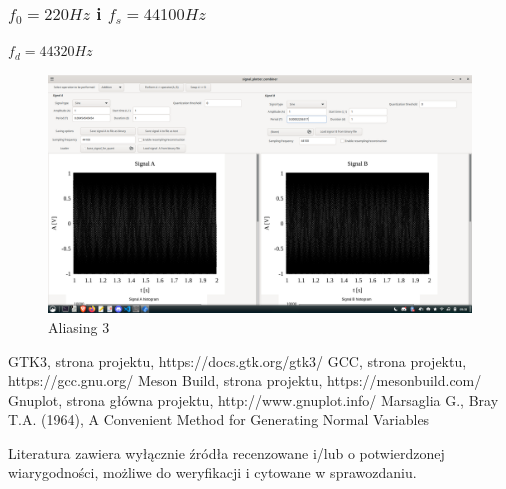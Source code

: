 \documentclass{article}
\begin{document}
\subsubsection{$f_0 = 220Hz$ i $f_s = 44100Hz$}
$f_d = 44320Hz$
\begin{figure}[H]
 \centering
 \includegraphics[width=14cm]{aliasing3.png}
 \vspace{-0.3cm}
 \caption{Aliasing 3}
 \label{fig:al3}
\end{figure}

\begin{thebibliography}{0}
 GTK3, strona projektu, https://docs.gtk.org/gtk3/
 GCC, strona projektu, https://gcc.gnu.org/  
 Meson Build, strona projektu, https://mesonbuild.com/
 Gnuplot, strona główna projektu, http://www.gnuplot.info/
 Marsaglia G., Bray T.A. (1964), A Convenient Method for Generating Normal Variables
\end{thebibliography}

Literatura zawiera wyłącznie źródła recenzowane i/lub o potwierdzonej wiarygodności,
możliwe do weryfikacji i cytowane w sprawozdaniu. 
\end{document}
